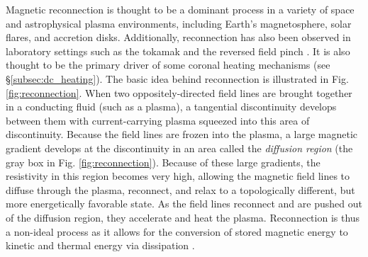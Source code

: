\par Magnetic reconnection is thought to be a dominant process in a variety of space and astrophysical plasma environments, including Earth's magnetosphere, solar flares, and accretion disks. Additionally, reconnection has also been observed in laboratory settings such as the tokamak and the reversed field pinch \citep{priest_magnetic_2000}. It is also thought to be the primary driver of some coronal heating mechanisms (see \S\ref{subsec:dc_heating}). The basic idea behind reconnection is illustrated in Fig. \ref{fig:reconnection}. When two oppositely-directed field lines are brought together in a conducting fluid (such as a plasma), a tangential discontinuity develops between them with current-carrying plasma squeezed into this area of discontinuity. Because the field lines are frozen into the plasma, a large magnetic gradient develops at the discontinuity in an area called the \textit{diffusion region} (the gray box in Fig. \ref{fig:reconnection}). Because of these large gradients, the resistivity in this region becomes very high, allowing the magnetic field lines to diffuse through the plasma, reconnect, and relax to a topologically different, but more energetically favorable state. As the field lines reconnect and are pushed out of the diffusion region, they accelerate and heat the plasma. Reconnection is thus a non-ideal process as it allows for the conversion of stored magnetic energy to kinetic and thermal energy via dissipation \citep{priest_magnetic_2000}.
%
